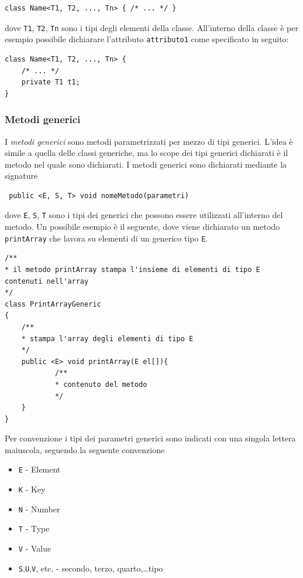 \documentclass{article}
\begin{document}
\begin{lstlisting}
class Name<T1, T2, ..., Tn> { /* ... */ }
\end{lstlisting}

dove \texttt{T1}, \texttt{T2}, \texttt{Tn} sono i tipi degli elementi della classe. All'interno della classe \`e per esempio possibile dichiarare l'attributo \texttt{attributo1} come specificato in seguito:

\begin{lstlisting}
class Name<T1, T2, ..., Tn> { 
    /* ... */
    private T1 t1;
}
\end{lstlisting}

\subsubsection{Metodi generici}
I \emph{metodi generici} sono metodi parametrizzati per mezzo di tipi generici. L'idea \`e simile a quella delle classi generiche, ma lo scope dei tipi generici dichiarati \`e il metodo nel quale sono  dichiarati. I metodi generici sono dichiarati mediante la signature

\begin{lstlisting}
 public <E, S, T> void nomeMetodo(parametri)
\end{lstlisting}

dove \texttt{E}, \texttt{S}, \texttt{T} sono i tipi dei generici che possono essere utilizzati all'interno del metodo. Un possibile esempio \`e il seguente, dove viene dichiarato un metodo \texttt{printArray} che lavora su elementi di un generico tipo \texttt{E}.

\begin{lstlisting}
/**
* il metodo printArray stampa l'insieme di elementi di tipo E contenuti nell'array
*/
class PrintArrayGeneric
{
    /**
    * stampa l'array degli elementi di tipo E
    */
    public <E> void printArray(E el[]){
            /**
            * contenuto del metodo
            */
    }
}
\end{lstlisting}

Per convenzione i tipi dei parametri generici sono indicati con una singola lettera maiuscola, seguendo la seguente convenzione
\begin{itemize}
\item \texttt{E} - Element
\item \texttt{K} - Key
\item \texttt{N} - Number
\item \texttt{T} - Type
\item \texttt{V} - Value
\item \texttt{S},\texttt{U},\texttt{V}, etc. - secondo, terzo, quarto,\dots tipo
\end{itemize}
\end{document}
